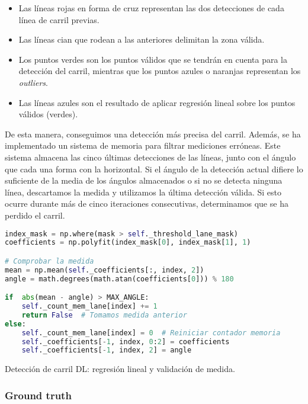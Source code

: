 \begin{itemize}
		\item Las líneas rojas en forma de cruz representan las dos detecciones de cada línea de carril previas.
		\item Las líneas cian que rodean a las anteriores delimitan la zona válida.
		\item Los puntos verdes son los puntos válidos que se tendrán en cuenta para la detección del carril, mientras que los puntos azules o naranjas representan los \textit{outliers}.
		\item Las líneas azules son el resultado de aplicar regresión lineal sobre los puntos válidos (verdes).
\end{itemize}

De esta manera, conseguimos una detección más precisa del carril. Además, se ha implementado un sistema de memoria para filtrar mediciones erróneas. Este sistema almacena las cinco últimas detecciones de las líneas, junto con el ángulo que cada una forma con la horizontal. Si el ángulo de la detección actual difiere lo suficiente de la media de los ángulos almacenados o si no se detecta ninguna línea, descartamos la medida y utilizamos la última detección válida. Si esto ocurre durante más de cinco iteraciones consecutivas, determinamos que se ha perdido el carril.

\begin{code}[h]
\begin{lstlisting}[language=Python]
index_mask = np.where(mask > self._threshold_lane_mask)
coefficients = np.polyfit(index_mask[0], index_mask[1], 1)

# Comprobar la medida
mean = np.mean(self._coefficients[:, index, 2])  
angle = math.degrees(math.atan(coefficients[0])) % 180  

if  abs(mean - angle) > MAX_ANGLE:
    self._count_mem_lane[index] += 1 
    return False  # Tomamos medida anterior
else:
    self._count_mem_lane[index] = 0  # Reiniciar contador memoria
    self._coefficients[-1, index, 0:2] = coefficients 
    self._coefficients[-1, index, 2] = angle

\end{lstlisting}
\caption[Detección de carril \ac{DL}: regresión lineal y validación de medida]{Detección de carril \ac{DL}: regresión lineal y validación de medida.}
\label{cod:dl_carril}
\end{code}

\subsubsection{Ground truth}

